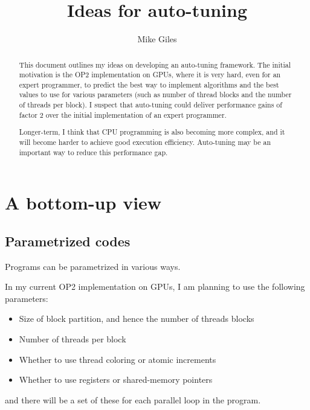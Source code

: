 \documentclass[12pt]{article}
\begin{document}
\title{Ideas for auto-tuning}
\author{Mike Giles}


\maketitle

\begin{abstract}
This document outlines my ideas on developing an auto-tuning
framework.  The initial motivation is the OP2 implementation 
on GPUs, where it is very hard, even for an expert programmer, 
to predict the best way to implement algorithms and the best values 
to use for various parameters (such as number of thread blocks 
and the number of threads per block).  I suspect that auto-tuning 
could deliver performance gains of factor 2 over the initial 
implementation of an expert programmer.

Longer-term, I think that CPU programming is also becoming more 
complex, and it will become harder to achieve good execution 
efficiency.  Auto-tuning may be an important way to reduce this 
performance gap.
\end{abstract}


\section{A bottom-up view}

\subsection{Parametrized codes}

Programs can be parametrized in various ways.

In my current OP2 implementation on GPUs, I am planning to use
the following parameters:
\begin{itemize}
\item
Size of block partition, and hence the number of threads blocks

\item
Number of threads per block

\item
Whether to use thread coloring or atomic increments

\item
Whether to use registers or shared-memory pointers
\end{itemize}
and there will be a set of these for each parallel loop 
in the program.
\end{document}
